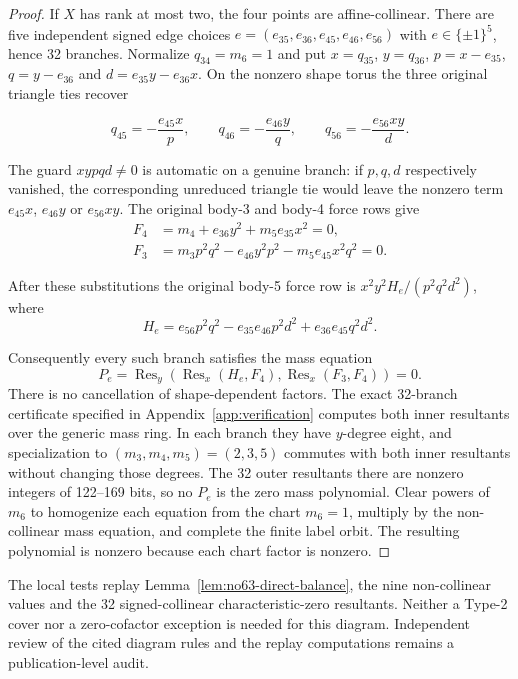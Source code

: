 \documentclass[11pt]{amsart}
\theoremstyle{remark}
\begin{document}
\begin{proof}
If $X$ has rank at most two, the four points are
affine-collinear. There are five independent signed edge
choices $e=(e_{35},e_{36},e_{45},e_{46},e_{56})$ with
$e\in\{\pm1\}^5$, hence 32 branches. Normalize
$q_{34}=m_6=1$ and put $x=q_{35}$, $y=q_{36}$,
$p=x-e_{35}$, $q=y-e_{36}$ and $d=e_{35}y-e_{36}x$.
On the nonzero shape torus the three original triangle ties
recover

\[
q_{45}=-\frac{e_{45}x}{p},\qquad
q_{46}=-\frac{e_{46}y}{q},\qquad
q_{56}=-\frac{e_{56}xy}{d}.
\]

The guard $xypqd\ne0$ is automatic on a genuine branch: if
$p,q,d$ respectively vanished, the corresponding unreduced
triangle tie would leave the nonzero term $e_{45}x$, $e_{46}y$
or $e_{56}xy$. The original body-3 and body-4 force rows give
\begin{equation}\label{eq:no63-collinear-masses}
\begin{aligned}
F_4&=m_4+e_{36}y^2+m_5e_{35}x^2=0,\\
F_3&=m_3p^2q^2-e_{46}y^2p^2-m_5e_{45}x^2q^2=0.
\end{aligned}
\end{equation}

After these substitutions the original body-5 force row is
$x^2y^2H_e/(p^2q^2d^2)$, where
\begin{equation}\label{eq:no63-collinear-shape}
H_e=e_{56}p^2q^2-e_{35}e_{46}p^2d^2
+e_{36}e_{45}q^2d^2.
\end{equation}

Consequently every such branch satisfies the mass equation
\begin{equation}\label{eq:no63-collinear-resultant}
P_e=\operatorname{Res}_y\!\left(
\operatorname{Res}_x(H_e,F_4),
\operatorname{Res}_x(F_3,F_4)\right)=0.
\end{equation}
There is no cancellation of shape-dependent factors. The exact
32-branch certificate specified in Appendix~\ref{app:verification}
computes both inner resultants over the generic mass ring. In
each branch they have $y$-degree eight, and specialization to
$(m_3,m_4,m_5)=(2,3,5)$ commutes with both inner resultants
without changing those degrees. The 32 outer resultants there
are nonzero integers of 122--169 bits, so no $P_e$ is the zero
mass polynomial. Clear powers of $m_6$ to homogenize each
equation from the chart $m_6=1$, multiply by the non-collinear
mass equation, and complete the finite label orbit. The
resulting polynomial is nonzero because each chart factor is
nonzero.
\end{proof}
The local tests replay Lemma~\ref{lem:no63-direct-balance},
the nine non-collinear values and the 32 signed-collinear
characteristic-zero resultants. Neither a Type-2 cover
nor a zero-cofactor exception is needed for this diagram.
Independent review of the cited diagram rules and the
replay computations remains a publication-level audit.
\end{document}
